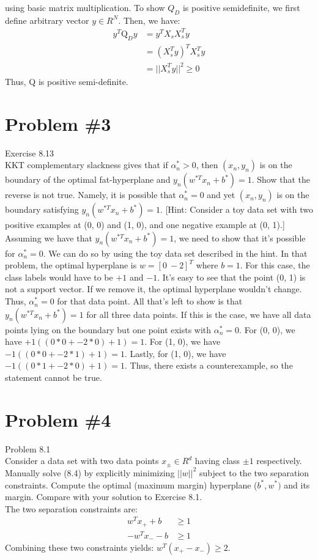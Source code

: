 \documentclass[12pt]{article}
\begin{document}
	using basic matrix multiplication.
	To show $Q_D$ is positive semidefinite, we first define arbitrary vector $y \in R^N$. Then, we have:
	\begin{align*}
		y^T \text{Q}_D y &= y^T X_sX_s^Ty \\
		&= (X_s^Ty)^T X_s^Ty\\
		&= ||X_s^Ty||^2 \ge 0
	\end{align*}
	Thus, Q is positive semi-definite.
	\section*{Problem \#3}
	Exercise 8.13 \\
	KKT complementary slackness gives that if $\alpha_n^* > 0$, then $(x_n , y_n)$ is on
	the boundary of the optimal fat-hyperplane and $y_n (w^{*T} x_n + b^{*} ) = 1$.
	Show that the reverse is not true. Namely, it is possible that $\alpha_n^* = 0$ and
	yet $(x_n , y_n)$ is on the boundary satisfying $y_n (w^{*T} x_n + b^{*} ) = 1$.
	[Hint: Consider a toy data set with two positive examples at (0, 0) and
	(1, 0), and one negative example at (0, 1).] \\
	Assuming we have that $y_n (w^{*T} x_n + b^{*} ) = 1$, we need to show that it's possible for $\alpha_n^* = 0$. We can do so by using the toy data set described in the hint. In that problem, the optimal hyperplane is $w = [0 \ -2]^T$ where $b=1$. For this case, the class labels would have to be $+1$ and $-1$. It's easy to see that the point (0, 1) is not a support vector. If we remove it, the optimal hyperplane wouldn't change. Thus, $\alpha_n^* = 0$ for that data point. All that's left to show is that $y_n (w^{*T} x_n + b^{*} ) = 1$ for all three data points. If this is the case, we have all data points lying on the boundary but one point exists with $\alpha_n^* = 0$. For (0, 0), we have $+1 ((0*0 + -2*0) + 1)=1$. For (1, 0), we have $-1 ((0*0 + -2*1) + 1)=1$. Lastly, for (1, 0), we have $-1 ((0*1 + -2*0) + 1)=1$. Thus, there exists a counterexample, so the statement cannot be true.
	\section*{Problem \#4}
	Problem 8.1 \\
	Consider a data set with two data points $x_{\pm} \in R^d$ having class $\pm1$ respectively. Manually solve (8.4) by explicitly minimizing $||w||^2$
	subject to the two separation constraints.
	Compute the optimal (maximum margin) hyperplane ($b^* , w^* )$ and its margin.
	Compare with your solution to Exercise 8.1. \\
	The two separation constraints are:
	\begin{align*}
		w^Tx_+ + b &\ge 1 \\
		-w^Tx_- -b &\ge 1  
	\end{align*}
	Combining these two constraints yields: $w^T(x_+ - x_-) \ge 2$.
\end{document}
